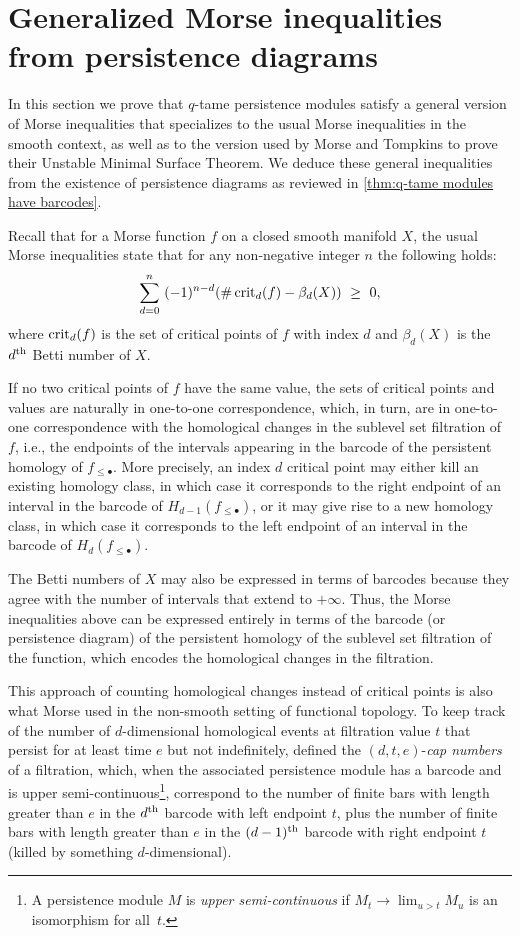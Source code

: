 
\section{Generalized Morse inequalities from persistence diagrams} \label{s:inequalities}

In this section we prove that $q$-tame persistence modules satisfy a general version of Morse inequalities that specializes to the usual Morse inequalities in the smooth context, as well as to the version used by Morse and Tompkins to prove their Unstable Minimal Surface Theorem.
We deduce these general inequalities from the existence of persistence diagrams as reviewed in \cref{thm:q-tame modules have barcodes}.

Recall that for a Morse function $f$ on a closed smooth manifold $X$, the usual Morse inequalities state that for any non-negative integer $n$ the following holds:
\begin{equation} \label{equ:morse_inequalities}
\sum_{d=0}^n \ (-1)^{n-d} ( \# \crit_{d}(f) - \beta_{d}(X) ) \ \geq\  0,  
\end{equation}
where $\operatorname{crit}_{d}(f)$ is the set of critical points of $f$ with index $d$ and $\beta_{d}(X)$ is the $d^{\mathrm{th}}$ Betti number of $X$.

If no two critical points of $f$ have the same value, the sets of critical points and values are naturally in one-to-one correspondence, which, in turn, are in one-to-one correspondence with the homological changes in the sublevel set filtration of $f$, i.e., the endpoints of the intervals appearing in the barcode of the persistent homology of $f_{\leq \bullet}$.
More precisely, an index $d$ critical point may either kill an existing homology class, in which case it corresponds to the right endpoint of an interval in the barcode of $H_{d-1}(f_{\leq \bullet})$, or it may give rise to a new homology class, in which case it corresponds to the left endpoint of an interval in the barcode of $H_d(f_{\leq \bullet})$.

The Betti numbers of $X$ may also be expressed in terms of barcodes because they agree with the number of intervals that extend to $+\infty$.
Thus, the Morse inequalities above can be expressed entirely in terms of the barcode (or persistence diagram) of the persistent homology of the sublevel set filtration of the function, which encodes the homological changes in the filtration.

This approach of counting homological changes instead of critical points is also what Morse used in the non-smooth setting of functional topology.
To keep track of the number of $d$-dimensional homological events at filtration value $t$ that persist for at least time $e$ but not indefinitely, \citet{Morse.1940} defined the $(d, t, e)$-\textit{cap numbers} of a filtration, which, when the associated persistence module has a barcode and is upper semi-continuous\footnote{A persistence module $M$ is \emph{upper semi-continuous} if $M_{t} \to \lim_{u > t} M_{u}$ is an isomorphism for all~$t$.}, correspond to the number of finite bars with length greater than $e$ in the $d^{\mathrm{th}}$ barcode with left endpoint $t$, plus the number of finite bars with length greater than $e$ in the $(d-1)^{\mathrm{th}}$ barcode with right endpoint $t$ (killed by something $d$-dimensional).

